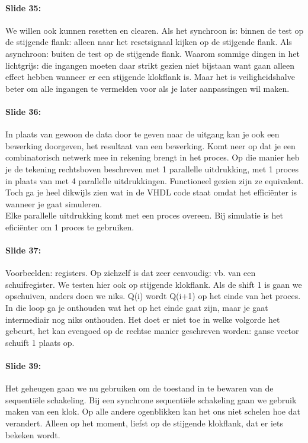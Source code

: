 \documentclass[10pt,a4paper]{book}
\begin{document}
\paragraph{Slide 35:} We willen ook kunnen resetten en clearen. Als het synchroon is: binnen de test op de stijgende flank: alleen naar het resetsignaal kijken op de stijgende flank. Als asynchroon: buiten de test op de stijgende flank. Waarom sommige dingen in het lichtgrijs: die ingangen moeten daar strikt gezien niet bijstaan want gaan alleen effect hebben wanneer er een stijgende klokflank is. Maar het is veiligheidshalve beter om alle ingangen te vermelden voor als je later aanpassingen wil maken.

\paragraph{Slide 36:} In plaats van gewoon de data door te geven naar de uitgang kan je ook een bewerking doorgeven, het resultaat van een bewerking. Komt neer op dat je een combinatorisch netwerk mee in rekening brengt in het proces. Op die manier heb je de tekening rechtsboven beschreven met 1 parallelle uitdrukking, met 1 proces in plaats van met 4 parallelle uitdrukkingen. Functioneel gezien zijn ze equivalent. Toch ga je heel dikwijls zien wat in de VHDL code staat omdat het effici\"enter is wanneer je gaat simuleren.\\
Elke parallelle uitdrukking komt met een proces overeen. Bij simulatie is het efici\"enter om 1 proces te gebruiken.

\paragraph{Slide 37:} Voorbeelden: registers. Op zichzelf is dat zeer eenvoudig: vb. van een schuifregister. We testen hier ook op stijgende klokflank. Als de shift 1 is gaan we opschuiven, anders doen we niks. Q(i) wordt Q(i+1) op het einde van het proces. In die loop ga je onthouden wat het op het einde gaat zijn, maar je gaat intermediair nog niks onthouden. Het doet er niet toe in welke volgorde het gebeurt, het kan evengoed op de rechtse manier geschreven worden: ganse vector schuift 1 plaats op.

\paragraph{Slide 39:} Het geheugen gaan we nu gebruiken om de toestand in te bewaren van de sequenti\"ele schakeling. Bij een synchrone sequenti\"ele schakeling gaan we gebruik maken van een klok. Op alle andere ogenblikken kan het ons niet schelen hoe dat verandert. Alleen op het moment, liefst op de stijgende klokflank, dat er iets bekeken wordt.
\end{document}
